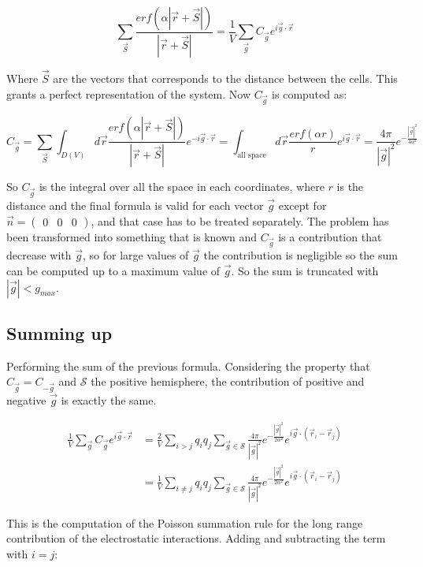 $$\sum\limits_{\vec{S}}\frac{erf(\alpha|\vec{r} + \vec{S}|)}{|\vec{r}+\vec{S}|} = \frac{1}{V}\sum\limits_{\vec{g}}C_{\vec{g}}e^{i\vec{g}\cdot\vec{r}}$$

Where $\vec{S}$ are the vectors that corresponds to the distance between the cells.
This grants a perfect representation of the system.
Now $C_{\vec{g}}$ is computed as:

$$C_{\vec{g}} = \sum\limits_{\vec{S}}\int_{D(V)} d\vec{r}\frac{erf(\alpha|\vec{r}+\vec{S}|)}{|\vec{r}+\vec{S}|}e^{-i\vec{g}\cdot\vec{r}} = \int_{\text{all space}}d\vec{r}\frac{erf(\alpha r)}{r}e^{i\vec{g}\cdot\vec{r}} = \frac{4\pi}{|\vec{g}|^2}e^{-\frac{|\vec{g}|^2}{4\alpha^2}}$$

So $C_{\vec{g}}$ is the integral over all the space in each coordinates, where $r$ is the distance and the final formula is valid for each vector $\vec{g}$ except for $\vec{n} = \begin{pmatrix} 0&0&0\end{pmatrix}$, and that case has to be treated separately.
The problem has been transformed into something that is known and $C_{\vec{g}}$ is a contribution that decrease with $\vec{g}$, so for large values of $\vec{g}$ the contribution is negligible so the sum can be computed up to a maximum value of $\vec{g}$.
So the sum is truncated with $|\vec{g}|<g_{max}$.

	\subsection{Summing up}
	Performing the sum of the previous formula.
	Considering the property that $C_{\vec{g}} = C_{-\vec{g}}$ and $\mathcal{S}$ the positive hemisphere, the contribution of positive and negative $\vec{g}$ is exactly the same.

	\begin{align*}
		\frac{1}{V}\sum\limits_{\vec{g}}C_{\vec{g}}e^{i\vec{g}\cdot\vec{r}} &= \frac{2}{V}\sum\limits_{i>j}q_iq_j\sum\limits_{\vec{g}\in\mathcal{S}}\frac{4\pi}{|\vec{g}|^2}e^{-\frac{|\vec{g}|^2}{2\alpha^2}}e^{i\vec{g}\cdot(\vec{r}_i-\vec{r}_j)}\\
																																				&=\frac{1}{V}\sum\limits_{i\neq j}q_iq_j\sum\limits_{\vec{g}\in\mathcal{S}}\frac{4\pi}{|\vec{g}|^2}e^{-\frac{|\vec{g}|^2}{2\alpha^2}}e^{i\vec{g}\cdot(\vec{r}_i-\vec{r}_j)}
	\end{align*}

	This is the computation of the Poisson summation rule for the long range contribution of the electrostatic interactions.
	Adding and subtracting the term with $i = j$:

